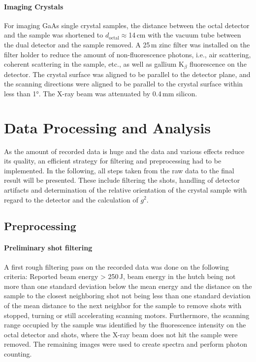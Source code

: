 \paragraph{Imaging Crystals}
For imaging GaAs single crystal samples, the distance between the octal detector and the sample was shortened to $d_\text{octal}\approx$14\,cm with the vacuum tube between the dual detector and the sample removed. A 25\,\textmu m zinc filter was installed on the filter holder to reduce the amount of non-fluorescence photons, i.e., air scattering, coherent scattering in the sample, etc., as well as gallium K$_\beta$ fluorescence on the detector. The crystal surface was aligned to be parallel to the detector plane, and the scanning directions were aligned to be parallel to the crystal surface within less than 1°. The X-ray beam was attenuated by 0.4\,mm silicon.

\section{Data Processing and Analysis}
As the amount of recorded data is huge and the data and various effects reduce its quality, an efficient strategy for filtering and preprocessing had to be implemented. In the following, all steps taken from the raw data to the final result will be presented. These include filtering the shots, handling of detector artifacts and determination of the relative orientation of the crystal sample with regard to the detector and the calculation of $g^2$.
\subsection{Preprocessing}

\paragraph{Preliminary shot filtering}
A first rough filtering pass on the recorded data was done on the following criteria: Reported beam energy > 250\,\textmu J, beam energy in the hutch being not more than one standard deviation below the mean energy and the distance on the sample to the closest neighboring shot not being less than one standard deviation of the mean distance to the next neighbor for the sample to remove shots with stopped, turning or still accelerating scanning motors. Furthermore, the scanning range occupied by the sample was identified by the fluorescence intensity on the octal detector and shots, where the X-ray beam does not hit the sample were removed. The remaining images were used to create spectra and perform photon counting.


